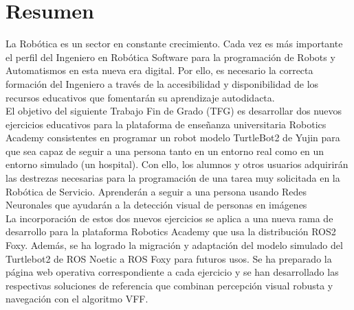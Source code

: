 \chapter*{Resumen}

La Robótica es un sector en constante crecimiento. Cada vez es más importante el perfil del Ingeniero en Robótica Software para la programación de Robots y Automatismos en esta nueva era digital. Por ello, es necesario la correcta formación del Ingeniero a través de la accesibilidad y disponibilidad de los recursos educativos que fomentarán su aprendizaje autodidacta.\\

El objetivo del siguiente Trabajo Fin de Grado (TFG) es desarrollar dos nuevos ejercicios educativos para la plataforma de enseñanza universitaria Robotics Academy consistentes en programar un robot modelo TurtleBot2 de Yujin para que sea capaz de seguir a una persona tanto en un entorno real como en un entorno simulado (un hospital). Con ello, los alumnos y otros usuarios adquirirán las destrezas necesarias para la programación de una tarea muy solicitada en la Robótica de Servicio. Aprenderán a seguir a una persona usando Redes Neuronales que ayudarán a la detección visual de personas en imágenes\\

La incorporación de estos dos nuevos ejercicios se aplica a una nueva rama de desarrollo para la plataforma Robotics Academy que usa la distribución ROS2 Foxy. Además, se ha logrado la migración y adaptación del modelo simulado del Turtlebot2 de ROS Noetic a ROS Foxy para futuros usos. Se ha preparado la página web operativa correspondiente a cada ejercicio y se han desarrollado las respectivas soluciones de referencia que combinan percepción visual robusta y navegación con el algoritmo VFF.